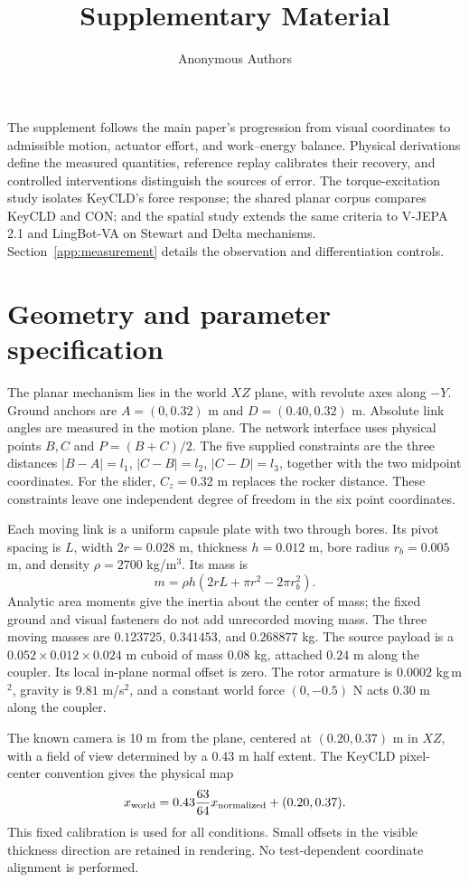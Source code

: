 \documentclass[10pt,twocolumn,letterpaper]{article}
\title{\keytitle\\Supplementary Material}
\author{Anonymous Authors}
\begin{document}
\maketitle
\nocite{*}
\appendix
The supplement follows the main paper's progression from visual coordinates to admissible motion, actuator effort, and work--energy balance. Physical derivations define the measured quantities, reference replay calibrates their recovery, and controlled interventions distinguish the sources of error. The torque-excitation study isolates KeyCLD's force response; the shared planar corpus compares KeyCLD and CON; and the spatial study extends the same criteria to V-JEPA 2.1 and LingBot-VA on Stewart and Delta mechanisms. Section~\ref{app:measurement} details the observation and differentiation controls.

\section{Geometry and parameter specification}
\label{app:mechanism}
The planar mechanism lies in the world $XZ$ plane, with revolute axes along $-Y$. Ground anchors are $A=(0,0.32)$ m and $D=(0.40,0.32)$ m. Absolute link angles are measured in the motion plane. The network interface uses physical points $B,C$ and $P=(B+C)/2$. The five supplied constraints are the three distances $|B-A|=l_1$, $|C-B|=l_2$, $|C-D|=l_3$, together with the two midpoint coordinates. For the slider, $C_z=0.32$ m replaces the rocker distance. These constraints leave one independent degree of freedom in the six point coordinates.

Each moving link is a uniform capsule plate with two through bores. Its pivot spacing is $L$, width $2r=0.028$ m, thickness $h=0.012$ m, bore radius $r_b=0.005$ m, and density $\rho=2700$ kg/m$^3$. Its mass is
\begin{equation}
m=\rho h\left(2rL+\pi r^2-2\pi r_b^2\right).
\end{equation}
Analytic area moments give the inertia about the center of mass; the fixed ground and visual fasteners do not add unrecorded moving mass. The three moving masses are $0.123725$, $0.341453$, and $0.268877$ kg. The source payload is a $0.052\times0.012\times0.024$ m cuboid of mass $0.08$ kg, attached $0.24$ m along the coupler. Its local in-plane normal offset is zero. The rotor armature is $0.0002$ kg\,m$^2$, gravity is $9.81$ m/s$^2$, and a constant world force $(0,-0.5)$ N acts $0.30$ m along the coupler.

The known camera is 10 m from the plane, centered at $(0.20,0.37)$ m in $XZ$, with a field of view determined by a $0.43$ m half extent. The KeyCLD pixel-center convention gives the physical map
\begin{equation}
x_{\rm world}=0.43\frac{63}{64}x_{\rm normalized}
+(0.20,0.37).
\end{equation}
This fixed calibration is used for all conditions. Small offsets in the visible thickness direction are retained in rendering. No test-dependent coordinate alignment is performed.
\end{document}
